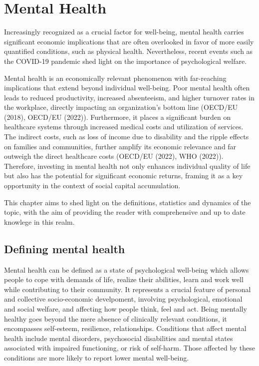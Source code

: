 \chapter{Mental Health}

Increasingly recognized as a crucial factor for well-being, mental health carries significant economic implications that are often overlooked in favor of more easily quantified conditions, such as physical health. Nevertheless, recent events such as the COVID-19 pandemic shed light on the importance of psychological welfare. 

Mental health is an economically relevant phenomenon with far-reaching implications that extend beyond individual well-being. Poor mental health often leads to reduced productivity, increased absenteeism, and higher turnover rates in the workplace, directly impacting an organization's bottom line (OECD/EU (2018), OECD/EU (2022)). Furthermore, it places a significant burden on healthcare systems through increased medical costs and utilization of services. The indirect costs, such as loss of income due to disability and the ripple effects on families and communities, further amplify its economic relevance and far outweigh the direct healthcare costs (OECD/EU (2022), WHO (2022)). Therefore, investing in mental health not only enhances individual quality of life but also has the potential for significant economic returns, framing it as a key opportunity in the context of social capital accumulation.

This chapter aims to shed light on the definitions, statistics and dynamics of the topic, with the aim of providing the reader with comprehensive and up to date knowlege in this realm. 

\section{Defining mental health}
    Mental health can be defined as a state of psychological well-being which allows people to cope with demands of life, realize their abilities, learn and work well while contributing to their community. It represents a crucial feature of personal and collective socio-economic develpoment, involving psychological, emotional and social welfare, and affecting how people think, feel and act. 
    Being mentally healthy goes beyond the mere absence of clinically relevant conditions, it encompasses self-esteem, resilience, relationships. Conditions that affect mental health include mental disorders, psychosocial disabilities and mental states associated with impaired functioning, or risk of self-harm. Those affected by these conditions are more likely to report lower mental well-being. 

